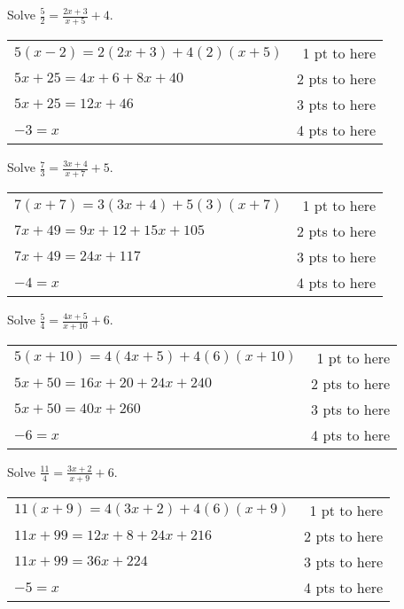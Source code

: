 {
	Solve $\displaystyle \frac{5}{2}=\frac{2x+3}{x+5}+4$.
}
{
	\begin{tabular}{l r}
	$5(x-2)=2(2x+3)+4(2)(x+5)$ & 1 pt to here \\
	$5x+25=4x+6+8x+40$ & 2 pts to here \\
	$5x+25=12x+46$ & 3 pts to here\\
	$-3=x$ & 4 pts to here
	\end{tabular}
}

{
	Solve $\displaystyle \frac{7}{3}=\frac{3x+4}{x+7}+5$.
}
{
	\begin{tabular}{l r}
	$7(x+7)=3(3x+4)+5(3)(x+7)$ & 1 pt to here \\
	$7x+49=9x+12+15x+105$ & 2 pts to here \\
	$7x+49=24x+117$ & 3 pts to here\\
	$-4=x$ & 4 pts to here
	\end{tabular}
}

{
	Solve $\displaystyle \frac{5}{4}=\frac{4x+5}{x+10}+6$.
}
{
	\begin{tabular}{l r}
	$5(x+10)=4(4x+5)+4(6)(x+10)$ & 1 pt to here \\
	$5x+50=16x+20+24x+240$ & 2 pts to here \\
	$5x+50=40x+260$ & 3 pts to here\\
	$-6=x$ & 4 pts to here
	\end{tabular}
}

{
	Solve $\displaystyle \frac{11}{4}=\frac{3x+2}{x+9}+6$.
}
{
	\begin{tabular}{l r}
	$11(x+9)=4(3x+2)+4(6)(x+9)$ & 1 pt to here \\
	$11x+99=12x+8+24x+216$ & 2 pts to here \\
	$11x+99=36x+224$ & 3 pts to here\\
	$-5=x$ & 4 pts to here
	\end{tabular}
}
